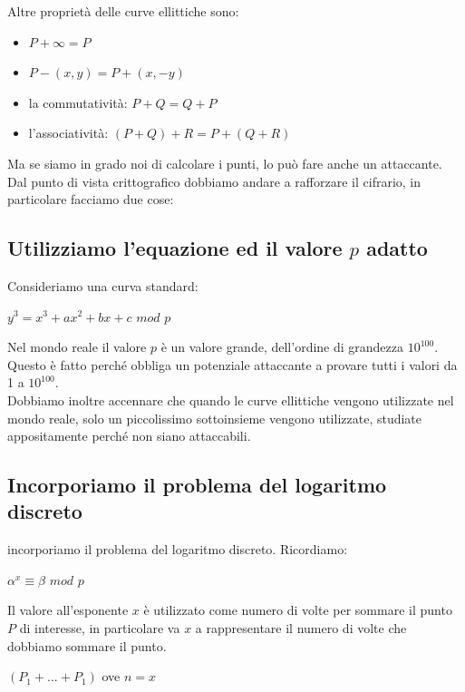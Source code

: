 \documentclass[11pt, oneside]{article}   	%
\begin{document}
Altre proprietà delle curve ellittiche sono:
\begin{itemize}
\item $P + \infty = P$
\item $P - (x, y ) = P + (x, -y)$
\item la commutatività: $P + Q = Q + P$
\item l'associatività: $(P + Q) + R = P +  (Q + R)$
\end{itemize}
Ma se siamo in grado noi di calcolare i punti, lo può fare anche un attaccante. Dal punto di vista crittografico dobbiamo andare a rafforzare il cifrario, in particolare facciamo due cose:

\subsection*{Utilizziamo l'equazione ed il valore $p$ adatto}
Consideriamo una curva standard:
\begin{center}
$y^3 = x^3 + ax^2 + bx + c$ $mod$ $p$
\end{center}
Nel mondo reale il valore $p$ è un valore grande, dell'ordine di grandezza $10^{100}$. Questo è fatto perché obbliga un potenziale attaccante a provare tutti i valori da 1 a $10^{100}$.\\

Dobbiamo inoltre accennare che quando le curve ellittiche vengono utilizzate nel mondo reale, solo un piccolissimo sottoinsieme vengono utilizzate, studiate appositamente perché non siano attaccabili.

\subsection*{Incorporiamo il problema del logaritmo discreto}
incorporiamo il problema del logaritmo discreto. Ricordiamo:
\begin{center}
$\alpha^x \equiv \beta$ $mod$ $p$
\end{center}
Il valore all'esponente $x$ è utilizzato come numero di volte per sommare il punto $P$ di interesse, in particolare va $x$ a rappresentare il numero di volte che dobbiamo sommare il punto.
\begin{center}
$(P_1 + ...  + P_1) $ ove $n = x$
\end{center}
\end{document}
